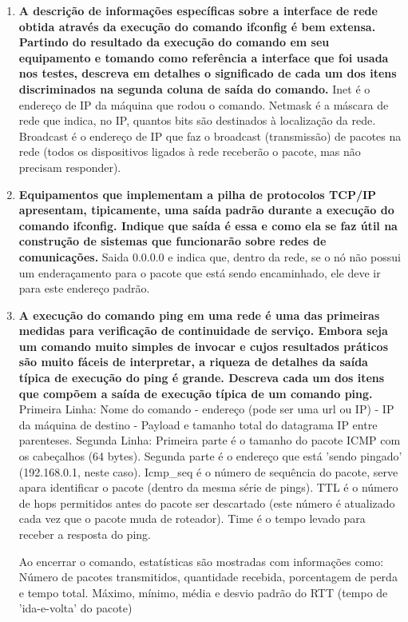 \begin{enumerate}
  \item \textbf{A descrição de informações específicas sobre a interface de rede obtida através da execução
    do comando ifconfig é bem extensa. Partindo do resultado da execução do comando em seu
    equipamento e tomando como referência a interface que foi usada nos testes, descreva em
    detalhes o significado de cada um dos itens discriminados na segunda coluna de saída do
    comando.}
    Inet é o endereço de IP da máquina que rodou o comando. Netmask é a máscara de rede que indica, no IP, quantos bits são destinados à localização da rede. Broadcast é o endereço de IP que faz o broadcast (transmissão) de pacotes na rede (todos os dispositivos ligados à rede receberão o pacote, mas não precisam responder).

  \item \textbf{Equipamentos que implementam a pilha de protocolos TCP/IP apresentam, tipicamente, uma
    saída padrão durante a execução do comando ifconfig. Indique que saída é essa e como ela
    se faz útil na construção de sistemas que funcionarão sobre redes de comunicações.}
    Saida 0.0.0.0 e indica que, dentro da rede, se o nó não possui um enderaçamento para o pacote que está sendo encaminhado, ele deve ir para este endereço padrão.

  \item \textbf{A execução do comando ping em uma rede é uma das primeiras medidas para verificação de
    continuidade de serviço. Embora seja um comando muito simples de invocar e cujos
    resultados práticos são muito fáceis de interpretar, a riqueza de detalhes da saída típica de
    execução do ping é grande. Descreva cada um dos itens que compõem a saída de execução
    típica de um comando ping.}
    Primeira Linha:
        Nome do comando - endereço (pode ser uma url ou IP) - IP da máquina de destino - Payload e tamanho total do datagrama IP entre parenteses.
    Segunda Linha:
        Primeira parte é o tamanho do pacote ICMP com os cabeçalhos (64 bytes). Segunda parte é o endereço que está 'sendo pingado' (192.168.0.1, neste caso). Icmp_seq é o número de sequência do pacote, serve apara identificar o pacote (dentro da mesma série de pings). TTL é o número de hops permitidos antes do pacote ser descartado (este número é atualizado cada vez que o pacote muda de roteador). Time é o tempo levado para receber a resposta do ping.
     
     Ao encerrar o comando, estatísticas são mostradas com informações como: Número de pacotes transmitidos, quantidade recebida, porcentagem de perda e tempo total. Máximo, mínimo, média e desvio padrão do RTT (tempo de 'ida-e-volta' do pacote)


\end{enumerate}
